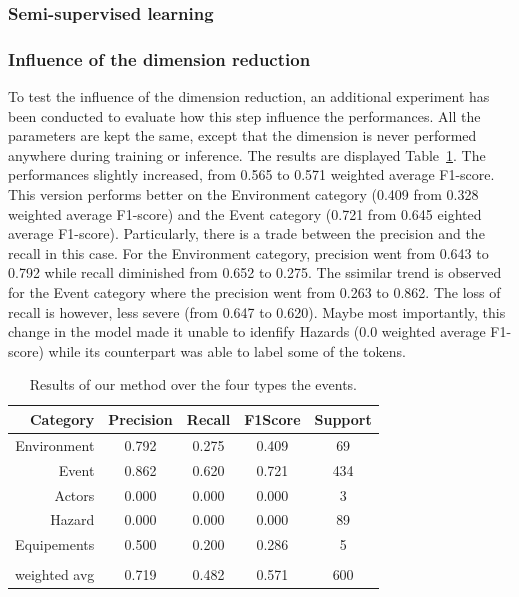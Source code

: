 \subsubsection{Semi-supervised learning}

\subsubsection{Influence of the dimension reduction}
To test the influence of the dimension reduction, an additional experiment has been
conducted to evaluate how this step influence the performances.
All the parameters are kept the same, except that the dimension is never performed anywhere
during training or inference.
The results are displayed Table~\ref{table:overall-results-nodim}.
The performances slightly increased, from 0.565 to 0.571 weighted average F1-score.
This version performs better on the Environment category (0.409 from 0.328 weighted average F1-score)
and the Event category (0.721 from 0.645 eighted average F1-score).
Particularly, there is a trade between the precision and the recall in this case.
For the Environment category, precision went from 0.643 to 0.792 while recall diminished
from 0.652 to 0.275.
The ssimilar trend is observed for the Event category  where the precision went from 0.263
to 0.862.
The loss of recall is however, less severe (from 0.647 to 0.620).
Maybe most importantly, this change in the model made it unable to idenfify Hazards (0.0 weighted average F1-score)
while its counterpart was able to label some of the tokens.

\begin{table}[bp]
    \centering
    \caption{Results of our method over the four types the events.}
    \begin{tabular}{rcccc}
        Category     & Precision & Recall & F1\-Score & Support \\
        \toprule
        Environment  & 0.792     & 0.275  & 0.409     & 69      \\
        Event        & 0.862     & 0.620  & 0.721     & 434     \\
        Actors       & 0.000     & 0.000  & 0.000     & 3       \\
        Hazard       & 0.000     & 0.000  & 0.000     & 89      \\
        Equipements  & 0.500     & 0.200  & 0.286     & 5       \\
                     &           &        &           &         \\
        weighted avg & 0.719     & 0.482  & 0.571     & 600     \\
        \bottomrule
    \end{tabular}
    \label{table:overall-results-nodim}
\end{table}

